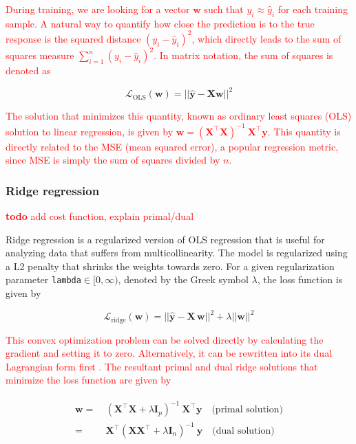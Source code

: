 \documentclass[utf8]{frontiersSCNS} %
\newcommand{\w}{\mathbf{w}}
\newcommand{\y}{\mathbf{y}}
\newcommand{\yhat}{\widehat{\mathbf{y}}}
\newcommand{\I}{\mathbf{I}}
\renewcommand{\L}{\mathcal{L}}
\newcommand{\X}{\mathbf{X}}
\newcommand{\ttt}[1]{\texttt{#1}}
\newcommand{\red}[1]{\textcolor{red}{#1}}
\newcommand{\todo}[1]{\textcolor{red}{\textbf{todo} #1}}
\begin{document}
\red{During training, we are looking for a vector $\w$ such that $y_i \approx\widehat{y}_i$ for each training sample. A natural way to quantify how close the prediction is to the true response is the squared distance $(y_i - \widehat{y}_i)^2$, which directly leads to the sum of squares measure $\sum_{i=1}^n (y_i - \widehat{y}_i)^2$. In matrix notation, the sum of squares is denoted as}

\begin{equation}
\label{eq:linreg_loss_function}
\L_\text{OLS}(\w) = ||\yhat - \X\w||^2
\end{equation}

\red{The solution that minimizes this quantity, known as ordinary least squares (OLS) solution to linear regression, is given by $\w = (\X^\top\X)^{-1}\ \X^\top\y$. This quantity is directly related to the MSE (mean squared error), a popular regression metric, since MSE is simply the sum of squares divided by $n$.}

\subsubsection{Ridge regression}

\todo{add cost function, explain primal/dual}

Ridge regression is a regularized version of OLS regression that is useful for analyzing data that suffers from multicollinearity. The model is regularized using a L2 penalty that shrinks the weights towards zero. For a given regularization parameter \ttt{lambda}$\in[0,\infty)$, denoted by the Greek symbol $\lambda$, the loss function is given by

\begin{equation}
\label{eq:ridge_loss_function}
\L_\text{ridge}(\w) = ||\yhat - \X\,\w||^2 + \lambda ||\w||^2
\end{equation}

\red{This convex optimization problem can be solved directly by calculating the gradient and setting it to zero. Alternatively, it can be rewritten into its dual Lagrangian form first  
\citep{Bishop2007}. The resultant primal and dual ridge solutions that minimize the loss function are given by}


\begin{align}
\begin{split}
\label{eq:ridge}
\w =\ & (\X^\top\X + \lambda\I_p)^{-1}\ \X^\top\y \quad\text{(primal solution)}\\
 =\ & \X^\top (\X\X^\top + \lambda\I_n)^{-1}\ \y \quad\text{(dual solution)}
\end{split}
\end{align}
\end{document}
